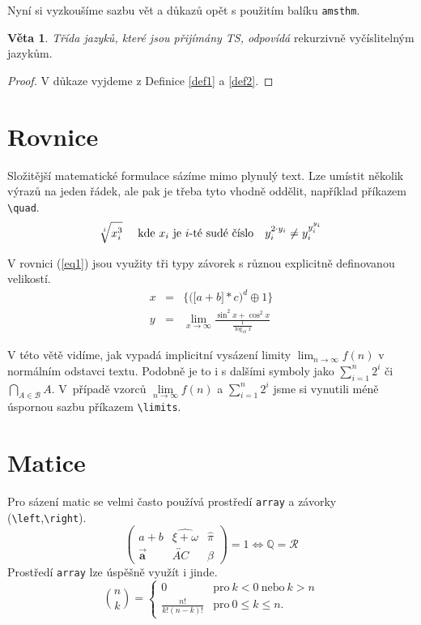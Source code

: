 \documentclass[a4paper,11pt]{article}
\theoremstyle{definition}
\newtheorem{sentence}{Věta}
\begin{document}
Nyní si vyzkoušíme sazbu vět a důkazů opět s použitím balíku \texttt{amsthm}.

\begin{sentence}
\emph{Třída jazyků, které jsou přijímány TS, odpovídá} rekurzivně vyčíslitelným jazykům.
\end{sentence}

\begin{proof}
V důkaze vyjdeme z Definice \ref{def1} a \ref{def2}.
\end{proof}

\section{Rovnice}\label{eq2}
Složitější matematické formulace sázíme mimo plynulý text. Lze umístit několik výrazů na jeden řádek, ale pak je třeba tyto vhodně oddělit, například příkazem \verb|\quad|.
\bigskip
$$ \sqrt[i]{x^3_i} \quad \textnormal{ kde $x_i$ je $i$-té sudé číslo} \quad y^{2 \cdot y_i}_i \neq y_i^{y_i^{y_i}} $$

V rovnici (\ref{eq1}) jsou využity tři typy závorek s různou explicitně definovanou velikostí.
\bigskip
\begin{eqnarray} \label{eq1}
x & = & \bigg\{ \Big( \big[ a + b \big] * c \Big)^d \oplus 1 \bigg\} \\
y & = & \lim_{x \to \infty} \frac{\sin^2{x} + \cos^2{x}}{\frac{1}{\log_{10}x}}
\end{eqnarray}

V této větě vidíme, jak vypadá implicitní vysázení limity $\lim_{n \to \infty}f(n)$ v normálním odstavci textu. Podobně je to i s dalšími symboly jako $\sum_{i=1}^n 2^i$ či $\bigcap_{A \in \mathcal{B}} A$. V~případě vzorců $\lim\limits_{n \to \infty}f(n)$ a $\sum\limits_{i=1}^n 2^i$ jsme si vynutili méně úspornou sazbu příkazem \verb|\limits|.

\section{Matice}
Pro sázení matic se velmi často používá prostředí \texttt{array} a závorky (\verb|\left|,\verb|\right|).
$$ \left(
\begin{array}{ccc} 
a + b & \widehat{\xi + \omega} & \hat{\pi} \\
\vec{\mathbf{a}} & \overleftrightarrow{AC} & \beta
\end{array} 
\right) = 1 \Longleftrightarrow \mathbb{Q} = \mathcal{R}$$
Prostředí \texttt{array} lze úspěšně využít i jinde.
$$  \binom{n}{k} = 
    \left\{
    \begin{array}{cl}
        0 & \text{pro}\ k < 0 \ \text{nebo}\ k > n  \\
        \frac{n!}{k!(n-k)!} &  \text{pro}\ 0 \leq k \leq n.
    \end{array}
    \right . $$
\end{document}
